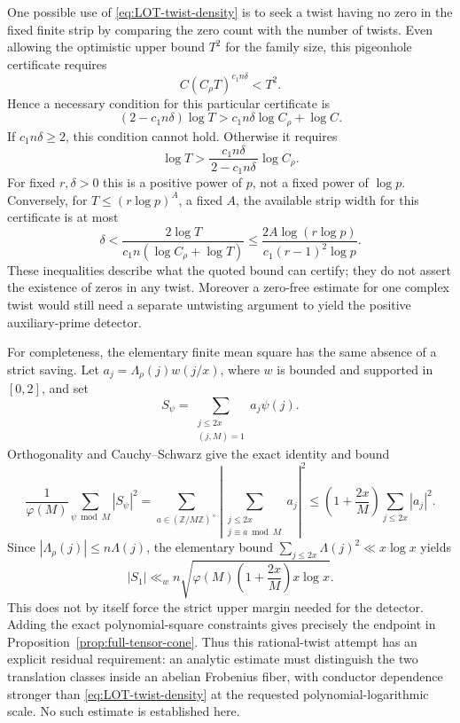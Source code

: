 \documentclass[11pt]{article}
\theoremstyle{definition}
\theoremstyle{remark}
\begin{document}
One possible use of \eqref{eq:LOT-twist-density} is to seek a twist
having no zero in the fixed finite strip by comparing the zero count
with the number of twists. Even allowing the optimistic upper bound
\(T^2\) for the family size, this pigeonhole certificate requires
\[
 C(C_\rho T)^{c_1n\delta}<T^2.
\]
Hence a necessary condition for this particular certificate is
\begin{equation}\label{eq:twist-density-scale}
 (2-c_1n\delta)\log T>
       c_1n\delta\log C_\rho+\log C.
\end{equation}
If \(c_1n\delta\geq2\), this condition cannot hold. Otherwise it
requires
\[
 \log T>
 \frac{c_1n\delta}{\,2-c_1n\delta\,}\log C_\rho.
\]
For fixed \(r,\delta>0\) this is a positive power of \(p\), not a
fixed power of \(\log p\). Conversely, for
\(T\leq(r\log p)^A\), a fixed \(A\), the available strip width for
this certificate is at most
\[
 \delta<
 \frac{2\log T}{c_1n(\log C_\rho+\log T)}
 \leq
 \frac{2A\log(r\log p)}{c_1(r-1)^2\log p}.
\]
These inequalities describe what the quoted bound can certify;
they do not assert the existence of zeros in any twist.
Moreover a zero-free estimate for one complex twist would still need
a separate untwisting argument to yield the positive auxiliary-prime
detector.

For completeness, the elementary finite mean square has the same
absence of a strict saving. Let
\(a_j=\Lambda_\rho(j)w(j/x)\), where \(w\) is bounded and supported
in \([0,2]\), and set
\[
 S_\psi=\sum_{\substack{j\leq2x\\(j,M)=1}}a_j\psi(j).
\]
Orthogonality and Cauchy--Schwarz give the exact identity and bound
\[
 \frac1{\varphi(M)}\sum_{\psi\bmod M}|S_\psi|^2
 =\sum_{a\in(\mathbb Z/M\mathbb Z)^\times}
       \left|\sum_{\substack{j\leq2x\\j\equiv a\bmod M}}a_j\right|^2
 \leq
 \left(1+\frac{2x}{M}\right)\sum_{j\leq2x}|a_j|^2.
\]
Since \(|\Lambda_\rho(j)|\leq n\Lambda(j)\), the elementary bound
\(\sum_{j\leq2x}\Lambda(j)^2\ll x\log x\) yields
\[
 |S_1|\ll_w
 n\sqrt{\varphi(M)\left(1+\frac{2x}{M}\right)x\log x}.
\]
This does not by itself force the strict upper margin needed for the
detector. Adding the exact polynomial-square constraints gives
precisely the endpoint in
Proposition~\ref{prop:full-tensor-cone}.
Thus this rational-twist attempt has an explicit residual requirement:
an analytic estimate must distinguish the two translation classes
inside an abelian Frobenius fiber, with conductor dependence stronger
than \eqref{eq:LOT-twist-density} at the requested polynomial-logarithmic
scale. No such estimate is established here.
\end{document}
